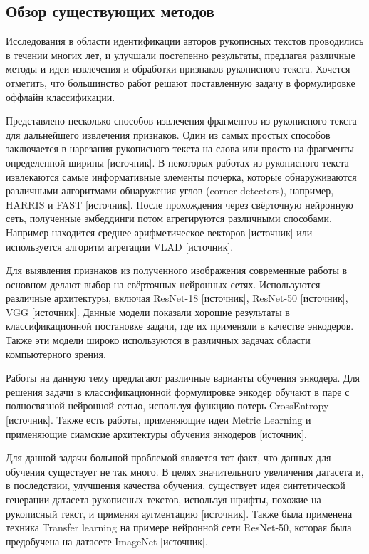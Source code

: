 \subsection{Обзор существующих методов}
    Исследования в области идентификации авторов рукописных текстов проводились в течении многих лет, и улучшали постепенно результаты, предлагая различные методы и идеи извлечения и обработки признаков рукописного текста. Хочется отметить, что большинство работ решают поставленную задачу в формулировке оффлайн классификации.
    
    Представлено несколько способов извлечения фрагментов из рукописного текста для дальнейшего извлечения признаков. Один из самых простых способов заключается в нарезания рукописного текста на слова или просто на фрагменты определенной ширины [источник]. В некоторых работах из рукописного текста извлекаются самые информативные элементы почерка, которые обнаруживаются различными алгоритмами обнаружения углов (corner-detectors), например, HARRIS и FAST [источник]. После прохождения через свёрточную нейронную сеть, полученные эмбеддинги потом агрегируются различными способами. Например находится среднее арифметическое векторов [источник] или используется алгоритм агрегации VLAD [источник]. 

    Для выявления признаков из полученного изображения современные работы в основном делают выбор на свёрточных нейронных сетях. Используются различные архитектуры, включая ResNet-18 [источник], ResNet-50 [источник], VGG [источник]. Данные модели показали хорошие результаты в классификационной постановке задачи, где их применяли в качестве энкодеров. Также эти модели широко используются в различных задачах области компьютерного зрения.

    Работы на данную тему предлагают различные варианты обучения энкодера. Для решения задачи в классификационной формулировке энкодер обучают в паре с полносвязной нейронной сетью, используя функцию потерь CrossEntropy [источник]. Также есть работы, применяющие идеи Metric Learning и применяющие сиамские архитектуры обучения энкодеров [источник].

    Для данной задачи большой проблемой является тот факт, что данных для обучения существует не так много. В целях значительного увеличения датасета и, в последствии, улучшения качества обучения, существует идея синтетической генерации датасета рукописных текстов, используя шрифты, похожие на рукописный текст, и применяя аугментацию [источник]. Также была применена техника Transfer learning на примере нейронной сети ResNet-50, которая была предобучена на датасете ImageNet [источник].

